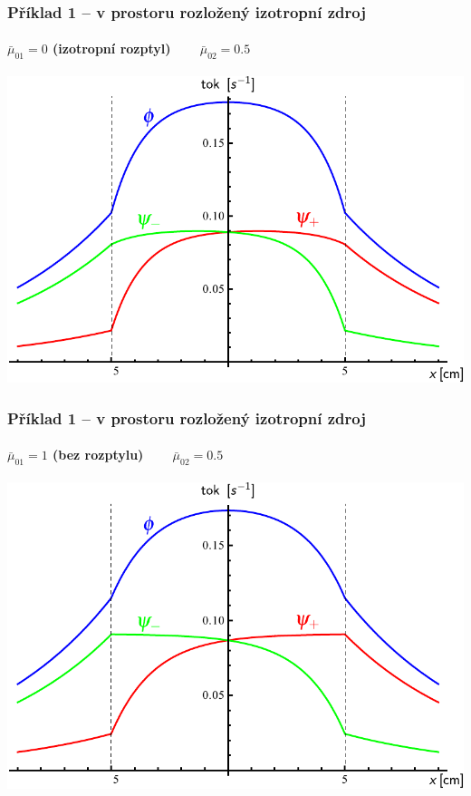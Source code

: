 \begin{frame}
  \frametitle{Příklad 1 -- v prostoru rozložený izotropní zdroj}
  \framesubtitle{$\bar\mu_{01} = 0$ (izotropní rozptyl)~~~~$\bar\mu_{02} = 0.5$}
  
  \centering\includegraphics[height=.8\paperheight]{obr/doleva_doprava/distribuovany_0_05}

\end{frame}

\begin{frame}
  \frametitle{Příklad 1 -- v prostoru rozložený izotropní zdroj}
  \framesubtitle{$\bar\mu_{01} = 1$ (bez rozptylu)~~~~$\bar\mu_{02} = 0.5$}
  
  \centering\includegraphics[height=.8\paperheight]{obr/doleva_doprava/distribuovany_1_05}

\end{frame}

